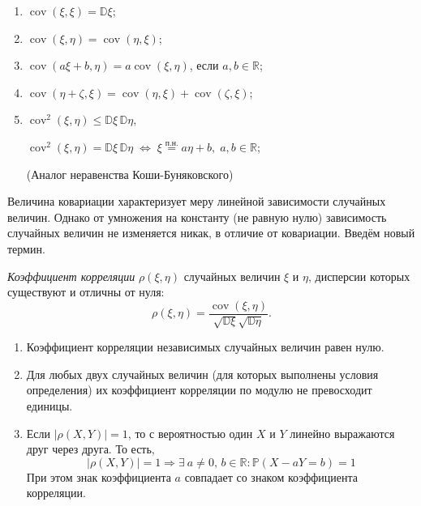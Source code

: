 \begin{namedthm}\leavevmode
    \begin{enumerate}
        \item 
            $\operatorname{cov}(\xi, \xi)=\mathbb{D} \xi$;
        \item 
            $\operatorname{cov}(\xi, \eta)=\operatorname{cov}(\eta, \xi)$;
        \item 
            $\operatorname{cov}(a \xi + b, \eta)=a \operatorname{cov}(\xi, \eta)$, если $a, b \in \mathbb{R}$;
        \item 
            $\operatorname{cov}(\eta + \zeta, \xi) = 
            \operatorname{cov}(\eta, \xi) + \operatorname{cov}(\zeta, \xi)$;
        \item 
            $\operatorname{cov}^2(\xi, \eta) \leqslant \mathbb{D}\xi \, \mathbb{D}\eta$,
        
            $\operatorname{cov}^2(\xi, \eta) = \mathbb{D}\xi \,\mathbb{D}\eta \; \Leftrightarrow \; \xi \overset{\text{п.н.}}{=} a\eta + b, \; a, b \in \mathbb{R}$;
        
        (Аналог неравенства Коши-Буняковского)
    \end{enumerate}
\end{namedthm}

Величина ковариации характеризует меру линейной зависимости случайных величин. 
Однако от умножения на константу (не равную нулю) зависимость случайных величин не изменяется никак, в отличие от ковариации. 
Введём новый термин.

\begin{defn}
    \textit{Коэффициент корреляции} $\rho(\xi,\eta)$ случайных величин $\xi$ и $\eta$, дисперсии которых существуют и отличны от нуля:
    \begin{equation*}
        \rho(\xi, \eta)=\frac{\operatorname{cov}(\xi, \eta)}{\sqrt{\mathbb{D} \xi} \sqrt{\mathbb{D} \eta}}.
    \end{equation*}
\end{defn}

\begin{namedthm}\leavevmode
    \begin{enumerate}
        \item 
            Коэффициент корреляции независимых случайных величин равен нулю.
        \item 
            Для любых двух случайных величин (для которых выполнены условия определения) их коэффициент корреляции по модулю не превосходит единицы.
        \item 
            Если $\bigl| \rho(X,Y) \bigr| = 1$, то с вероятностью один $X$ и $Y$ линейно выражаются друг через друга. 
            То есть,
            \begin{equation*}
                \bigl| \rho(X, Y) \bigr| = 1 \Longrightarrow \exists \: a \neq 0, \, b \in \mathbb{R}\colon \mathbb{P}(X - aY = b) = 1
            \end{equation*}
            При этом знак коэффициента $a$ совпадает со знаком коэффициента корреляции.
    \end{enumerate}
\end{namedthm}

